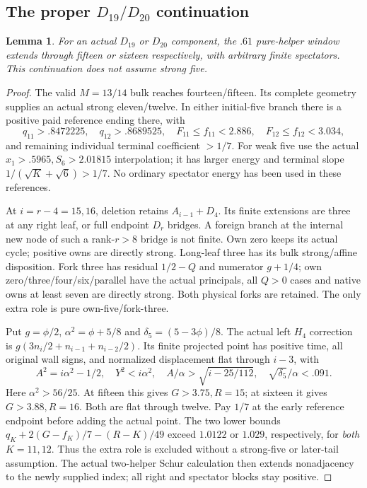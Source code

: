 \documentclass[11pt]{article}
\newtheorem{lemma}[theorem]{Lemma}
\theoremstyle{definition}
\theoremstyle{remark}
\begin{document}
\subsection[The proper D19/D20 continuation]{The proper $D_{19}/D_{20}$ continuation}
\label{app:tail:properD1920}
\begin{lemma}
\label{app:tail:lem:D4proper}
For an actual $D_{19}$ or $D_{20}$ component, the $.61$ pure-helper
window extends through fifteen or sixteen respectively, with arbitrary
finite spectators. This continuation does not assume strong five.
\end{lemma}
\begin{proof}
The valid $M=13/14$ bulk reaches fourteen/fifteen. Its complete
geometry supplies an actual strong eleven/twelve. In either initial-five
branch there is a positive paid reference ending there, with
\[
 q_{11}>.8472225,\quad q_{12}>.8689525,\quad
 F_{11}\le f_{11}<2.886,\quad F_{12}\le f_{12}<3.034,
\]
and remaining individual terminal coefficient $>1/7$.
For weak five use the actual $x_1>.5965,S_6>2.01815$ interpolation;
it has larger energy and terminal slope $1/(\sqrt K+\sqrt6)>1/7$.
No ordinary spectator energy has been used in these references.

At $i=r-4=15,16$, deletion retains $A_{i-1}+D_4$.
Its finite extensions are three at any right leaf, or full endpoint
$D_r$ bridges. A foreign branch at the internal new node of such a
rank-$r>8$ bridge is not finite. Own zero keeps its actual cycle;
positive owns are directly strong. Long-leaf three has its bulk
strong/affine disposition. Fork three has residual $1/2-Q$ and
numerator $g+1/4$; own zero/three/four/six/parallel have the actual
principals, all $Q>0$ cases and native owns at least seven are
directly strong. Both physical forks are retained. The only extra
role is pure own-five/fork-three.

Put $g=\phi/2$, $\alpha^2=\phi+5/8$ and
$\delta_5=(5-3\phi)/8$. The actual left $H_4$ correction is
$g(3n_i/2+n_{i-1}+n_{i-2}/2)$. Its finite projected point has
positive time, all original wall signs, and normalized displacement
flat through $i-3$, with
\[
 A^2=i\alpha^2-1/2,\quad Y^2<i\alpha^2,\quad
 A/\alpha>\sqrt{i-25/112},\quad
 \sqrt{\delta_5}/\alpha<.091.
\]
Here $\alpha^2>56/25$. At fifteen this gives $G>3.75,R=15$;
at sixteen it gives $G>3.88,R=16$. Both are flat through twelve.
Pay $1/7$ at the early reference endpoint before adding the actual
point. The two lower bounds
$q_K+2(G-f_K)/7-(R-K)/49$ exceed $1.0122$ or $1.029$,
respectively, for \emph{both} $K=11,12$. Thus the extra role is
excluded without a strong-five or later-tail assumption.
The actual two-helper Schur calculation then extends nonadjacency
to the newly supplied index; all right and spectator blocks stay positive.
\end{proof}
\end{document}
